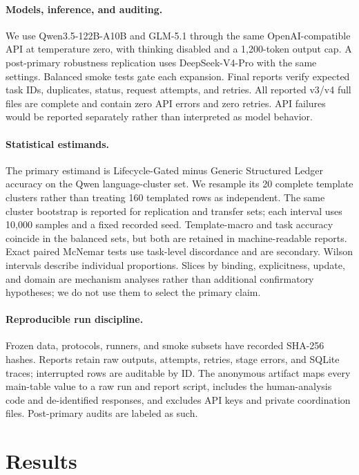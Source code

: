 \documentclass[letterpaper]{article}
\begin{document}
\paragraph{Models, inference, and auditing.}
We use Qwen3.5-122B-A10B and GLM-5.1 through the same OpenAI-compatible API at temperature zero,
with thinking disabled and a 1,200-token output cap. A post-primary robustness replication uses
DeepSeek-V4-Pro with the same settings. Balanced smoke tests gate each expansion.
Final reports verify expected task IDs, duplicates, status, request attempts, and retries. All
reported v3/v4 full files are complete and contain zero API errors and zero retries. API failures
would be reported separately rather than interpreted as model behavior.

\paragraph{Statistical estimands.}
The primary estimand is Lifecycle-Gated minus Generic Structured Ledger accuracy on the Qwen
language-cluster set. We resample its 20 complete template clusters rather than treating 160
templated rows as independent. The same cluster bootstrap is reported for replication and
transfer sets; each interval uses 10,000 samples and a fixed recorded seed. Template-macro and
task accuracy coincide in the balanced sets, but both are retained in machine-readable reports.
Exact paired McNemar tests use task-level discordance and are secondary. Wilson intervals
describe individual proportions. Slices by binding, explicitness, update, and domain are
mechanism analyses rather than additional confirmatory hypotheses; we do not use them to select
the primary claim.

\paragraph{Reproducible run discipline.}
Frozen data, protocols, runners, and smoke subsets have recorded SHA-256 hashes. Reports retain
raw outputs, attempts, retries, stage errors, and SQLite traces; interrupted rows are auditable by
ID. The anonymous artifact maps every main-table value to a raw run and report script, includes
the human-analysis code and de-identified responses, and excludes API keys and private
coordination files. Post-primary audits are labeled as such.

\section{Results}
\end{document}

